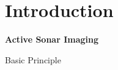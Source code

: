 \documentclass[
    beamer                                       %
 , xelatex                                      %
]{common/mytemplate}
\begin{document}
\renewcommand{\frametitle}[2]{{\vspace*{10pt}\bf\Large #1\par}}





\section{Introduction}

\begin{frame}
\frametitle{Active Sonar Imaging}
\framesubtitle{Basic Principle}
\vspace{-25pt}
\begin{figure}[H]
\begin{narrow}{-0.5cm}{0pt}
\hspace{-10pt}
\end{narrow}
\end{figure}
\end{frame}
\end{document}
